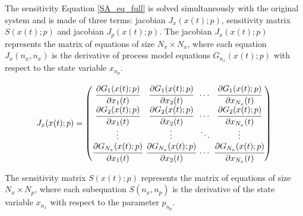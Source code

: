 \documentclass[../Article_Design_of_Experiment.tex]{subfiles}
\begin{document}
	The sensitivity Equation \ref{SA_eq_full} is solved simultaneously with the original system and is made of three terms: jacobian ${J_x}({x}(t);{p})$, sensitivity matrix ${S}({x}(t);{p})$ and jacobian ${J_p}({x}(t);{p})$. The jacobian ${J_x}({x}(t);{p})$ represents the matrix of equations of size $N_x \times N_x$, where each equation ${J_x}(n_x,n_x)$ is the derivative of process model equations ${G}_{n_x}({x}(t);{p})$ with respect to the state variable $x_{n_p}$.
	
	{\footnotesize
		\begin{align}
			\begingroup %
			\setlength\arraycolsep{2pt}
			{J_x}({x}(t);{p})=\begin{pmatrix}
				\cfrac{\partial {G_{1}}({x}(t);{p})}{\partial {x_{1}}(t)} & \cfrac{\partial {G_{1}}({x}(t);{p})}{\partial {x_{2}}(t)} & \cdots & \cfrac{\partial {G_{1}}({x}(t);{p})}{\partial {x_{N_x}}(t)}\\
				\cfrac{\partial {G_{2}}({x}(t);{p})}{\partial {x_{1}}(t)} & \cfrac{\partial {G_{2}}({x}(t);{p})}{\partial {x_{2}}(t)} & \cdots & \cfrac{\partial {G_{2}}({x}(t);{p})}{\partial {x_{N_x}}(t)}\\
				\vdots & \vdots & \ddots & \vdots\\ 
				\cfrac{\partial {G_{N_x}}({x}(t);{p})}{\partial {x_{1}}(t)} & \cfrac{\partial {G_{N_x}}({x}(t);{p})}{\partial {x_{2}}(t)} & \cdots & \cfrac{\partial {G_{N_x}}({x}(t);{p})}{\partial {x_{N_x}}(t)}\\
			\end{pmatrix}
			\endgroup
	\end{align} }
	
	The sensitivity matrix ${S}({x}(t);{p})$ represents the matrix of equations of size $N_x \times N_p$, where each subequation ${S}(n_x,n_p)$ is the derivative of the state variable $x_{n_x}$ with respect to the parameter $p_{n_p}$.
	
\end{document}
